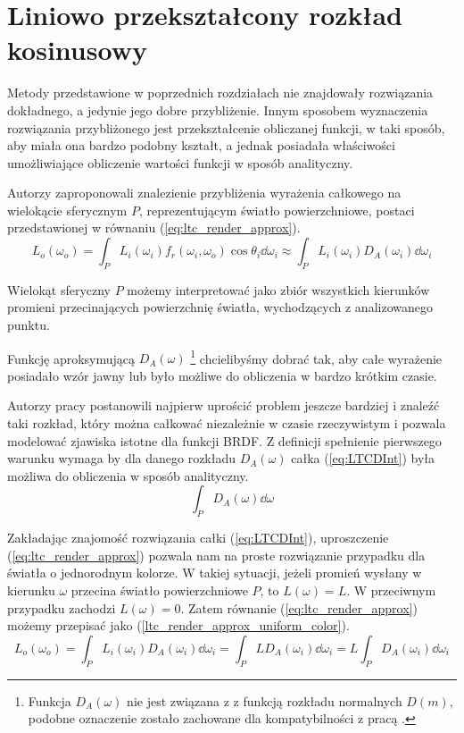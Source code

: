 \documentclass[../main.tex]{subfiles}
\begin{document}
\chapter{Liniowo przekształcony rozkład kosinusowy}
\label{Chapter:LTC}

Metody przedstawione w poprzednich rozdziałach nie znajdowały rozwiązania dokładnego, a jedynie jego dobre przybliżenie. Innym sposobem wyznaczenia rozwiązania przybliżonego jest przekształcenie obliczanej funkcji, w taki sposób, aby miała ona bardzo podobny kształt, a jednak posiadała właściwości umożliwiające obliczenie wartości funkcji w sposób analityczny.

Autorzy \cite{ltc_heitz} zaproponowali znalezienie przybliżenia wyrażenia całkowego na wielokącie sferycznym $P$, reprezentującym światło powierzchniowe, postaci przedstawionej w równaniu (\ref{eq:ltc_render_approx}).
\begin{equation}
L_o(\omega_o) = \int_{P} {
  L_i(\omega_i)
  f_r(\omega_i, \omega_o)
  \cos \theta_i
  \dd \omega_i
}
\approx
\int_{P} {
  L_i(\omega_i)
  D_A(\omega_i)
  \dd \omega_i
}
\label{eq:ltc_render_approx}
\end{equation}

Wielokąt sferyczny $P$ możemy interpretować jako zbiór wszystkich kierunków promieni przecinających powierzchnię światła, wychodzących z analizowanego punktu.

Funkcję aproksymującą $D_A(\omega)$ \footnote{Funkcja $D_A(\omega)$ nie jest związana z z funkcją rozkładu normalnych $D(m)$, podobne oznaczenie zostało zachowane dla kompatybilności z pracą \cite{ltc_heitz}.} chcielibyśmy dobrać tak, aby całe wyrażenie posiadało wzór jawny lub było możliwe do obliczenia w bardzo krótkim czasie.

Autorzy pracy \cite{ltc_heitz} postanowili najpierw uprościć problem jeszcze bardziej i znaleźć taki rozkład, który można całkować niezależnie w czasie rzeczywistym i pozwala modelować zjawiska istotne dla funkcji BRDF. Z definicji spełnienie pierwszego warunku wymaga by dla danego rozkładu $D_A(\omega)$ całka  (\ref{eq:LTCDInt}) była możliwa do obliczenia w sposób analityczny.
\begin{equation}
\int_P {
    D_A(\omega)
    \dd \omega
}
\label{eq:LTCDInt}
\end{equation}

Zakładając znajomość rozwiązania całki (\ref{eq:LTCDInt}), uproszczenie (\ref{eq:ltc_render_approx}) pozwala nam na proste rozwiązanie przypadku dla światła o jednorodnym kolorze. W takiej sytuacji, jeżeli promień wysłany w kierunku $\omega$ przecina światło powierzchniowe $P$, to $L(\omega)=L$. W przeciwnym przypadku zachodzi $L(\omega)=0$. Zatem równanie (\ref{eq:ltc_render_approx}) możemy przepisać jako (\ref{ltc_render_approx_uniform_color}).
\begin{equation}
L_o(\omega_o) =
\int_{P} {
    L_i(\omega_i)
    D_A(\omega_i)
    \dd \omega_i
} = \int_{P} {
    L
    D_A(\omega_i)
    \dd \omega_i
} = L \int_{P} {
    D_A(\omega_i)
    \dd \omega_i
}
\label{ltc_render_approx_uniform_color}
\end{equation}
\end{document}
